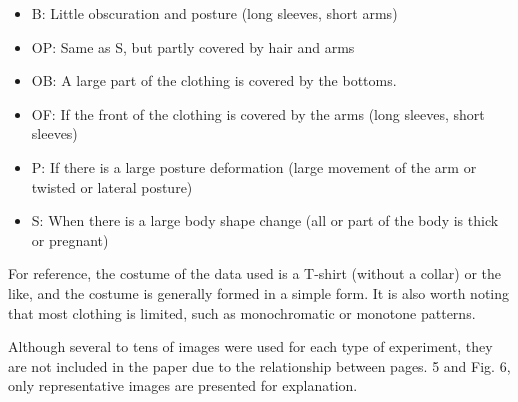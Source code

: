 \begin{itemize}

\item B: Little obscuration and posture (long sleeves, short arms)
\item OP: Same as S, but partly covered by hair and arms
\item OB: A large part of the clothing is covered by the bottoms.
\item OF: If the front of the clothing is covered by the arms (long sleeves, short sleeves)
\item P: If there is a large posture deformation (large movement of the arm or twisted or lateral posture)
\item S: When there is a large body shape change (all or part of the body is thick or pregnant)

\end{itemize}

For reference, the costume of the data used is a T-shirt (without a collar) or the like, and the costume is generally formed in a simple form. It is also worth noting that most clothing is limited, such as monochromatic or monotone patterns.


Although several to tens of images were used for each type of experiment, they are not included in the paper due to the relationship between pages. 5 and Fig. 6, only representative images are presented for explanation.

